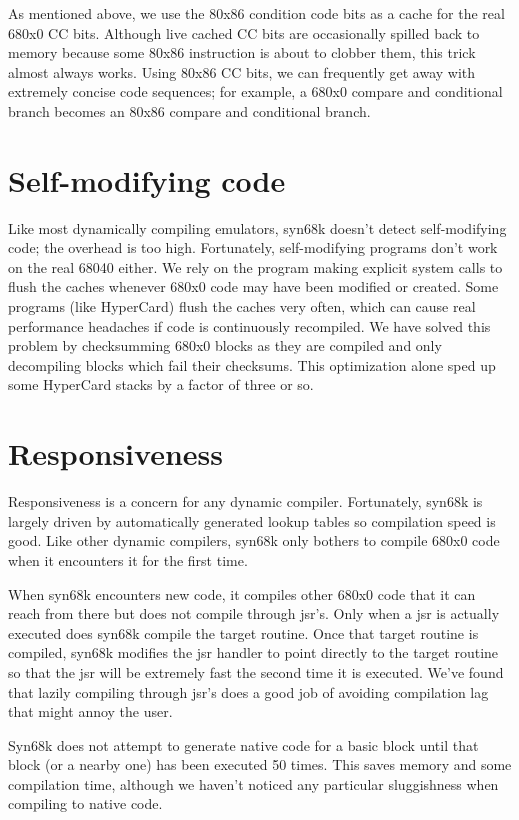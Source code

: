 As mentioned above, we use the 80x86 condition code bits as a cache
for the real 680x0 CC bits.  Although live cached CC bits are
occasionally spilled back to memory because some 80x86 instruction
is about to clobber them, this trick almost always works.  Using
80x86 CC bits, we can frequently get away with extremely concise
code sequences; for example, a 680x0 compare and conditional branch
becomes an 80x86 compare and conditional branch.

\section{Self-modifying code}

Like most dynamically compiling emulators, syn68k doesn't detect
self-modifying code; the overhead is too high.  Fortunately,
self-modifying programs don't work on the real 68040 either.  We
rely on the program making explicit system calls to flush the caches
whenever 680x0 code may have been modified or created.  Some programs
(like HyperCard) flush the caches very often, which can cause real
performance headaches if code is continuously recompiled.  We have
solved this problem by checksumming 680x0 blocks as they are compiled
and only decompiling blocks which fail their checksums.  This
optimization alone sped up some HyperCard stacks by a factor of
three or so.

\section{Responsiveness}

Responsiveness is a concern for any dynamic compiler.  Fortunately,
syn68k is largely driven by automatically generated lookup tables
so compilation speed is good.  Like other dynamic compilers, syn68k
only bothers to compile 680x0 code when it encounters it for the
first time.

When syn68k encounters new code, it compiles other 680x0 code that
it can reach from there but does not compile through jsr's.  Only
when a jsr is actually executed does syn68k compile the target
routine.  Once that target routine is compiled, syn68k modifies
the jsr handler to point directly to the target routine so that
the jsr will be extremely fast the second time it is executed.
We've found that lazily compiling through jsr's does a good job of
avoiding compilation lag that might annoy the user.

Syn68k does not attempt to generate native code for a basic block
until that block (or a nearby one) has been executed 50 times.
This saves memory and some compilation time, although we haven't
noticed any particular sluggishness when compiling to native code.


